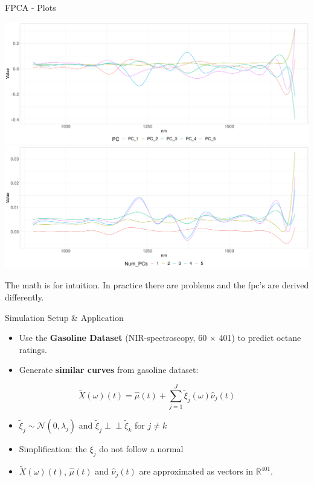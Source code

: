 \documentclass{beamer}
\newcommand{\independent}{\perp\!\!\!\!\perp}
\begin{document}
	\begin{frame}{FPCA - Plots}
		\begin{minipage}[c]{0.78\textwidth}
			\includegraphics[width = \textwidth]{../Graphics/principal_components.pdf}
			\includegraphics[width = \textwidth]{../Graphics/pc_approx.pdf}
		\end{minipage}
		\begin{minipage}[c]{0.19\textwidth}
			The math is for intuition. In practice there are problems and the fpc's are derived differently.
		\end{minipage}
	\end{frame}
	

	\begin{frame}{Simulation Setup \& Application}
		\begin{itemize}
			\item Use the \textbf{Gasoline Dataset} (NIR-spectroscopy, 60 $\times$ 401) to predict octane ratings.
			\item Generate \textbf{similar curves} from gasoline dataset:
		\end{itemize}
	
		$$\tilde{X}(\omega)(t) = \hat{\mu}(t) + \sum_{j = 1}^{J} \tilde{\xi}_j(\omega) \hat{\nu}_j(t)$$ 

		\begin{itemize}
			\item $\tilde{\xi}_{j} \sim \mathcal{N}(0,\hat{\lambda}_j)$ and $\tilde{\xi}_{j} \independent \tilde{\xi}_{k}$ for $j \neq k$
			\item Simplification: the $\xi_{j}$ do not follow a normal
			\item $\tilde{X}(\omega)(t)$, $\hat{\mu}(t)$ and $\hat{\nu}_j(t)$ are approximated as vectors in $\mathbb{R}^{401}$.
		\end{itemize}
		
	\end{frame}
	
\end{document}
